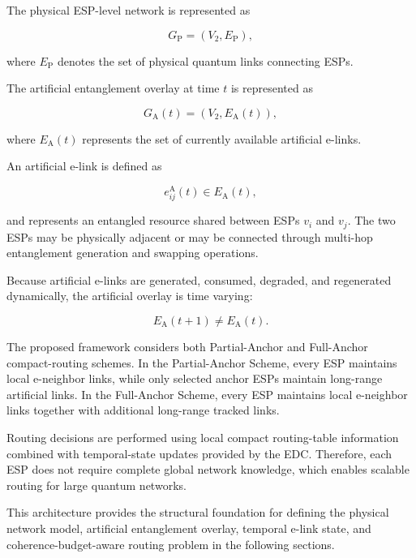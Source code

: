 The physical ESP-level network is represented as

\begin{equation}
    G_{\mathrm{P}}
    =
    \left(
    V_{2},
    E_{\mathrm{P}}
    \right),
\end{equation}

where $E_{\mathrm{P}}$ denotes the set of physical quantum links connecting ESPs.

The artificial entanglement overlay at time $t$ is represented as

\begin{equation}
    G_{\mathrm{A}}(t)
    =
    \left(
    V_{2},
    E_{\mathrm{A}}(t)
    \right),
\end{equation}

where $E_{\mathrm{A}}(t)$ represents the set of currently available artificial e-links.

An artificial e-link is defined as

\begin{equation}
    e_{ij}^{\mathrm{A}}(t)
    \in
    E_{\mathrm{A}}(t),
\end{equation}

and represents an entangled resource shared between ESPs $v_i$ and $v_j$. The two ESPs may be physically adjacent or may be connected through multi-hop entanglement generation and swapping operations.

Because artificial e-links are generated, consumed, degraded, and regenerated dynamically, the artificial overlay is time varying:

\begin{equation}
    E_{\mathrm{A}}(t+1)
    \neq
    E_{\mathrm{A}}(t).
\end{equation}

The proposed framework considers both Partial-Anchor and Full-Anchor compact-routing schemes. In the Partial-Anchor Scheme, every ESP maintains local e-neighbor links, while only selected anchor ESPs maintain long-range artificial links. In the Full-Anchor Scheme, every ESP maintains local e-neighbor links together with additional long-range tracked links.

Routing decisions are performed using local compact routing-table information combined with temporal-state updates provided by the EDC. Therefore, each ESP does not require complete global network knowledge, which enables scalable routing for large quantum networks.

This architecture provides the structural foundation for defining the physical network model, artificial entanglement overlay, temporal e-link state, and coherence-budget-aware routing problem in the following sections.
